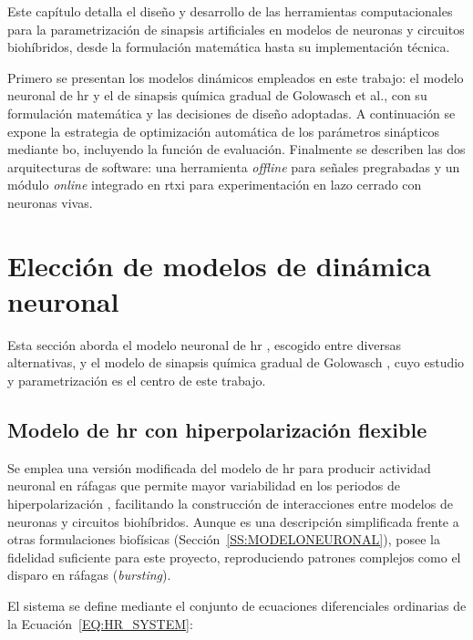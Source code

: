 
Este capítulo detalla el diseño y desarrollo de las herramientas computacionales para la parametrización de sinapsis artificiales en modelos de neuronas y circuitos biohíbridos, desde la formulación matemática hasta su implementación técnica.

Primero se presentan los modelos dinámicos empleados en este trabajo: el modelo neuronal de \ac{hr} y el de sinapsis química gradual de Golowasch et al., con su formulación matemática y las decisiones de diseño adoptadas. A continuación se expone la estrategia de optimización automática de los parámetros sinápticos mediante \ac{bo}, incluyendo la función de evaluación. Finalmente se describen las dos arquitecturas de software: una herramienta \textit{offline} para señales pregrabadas y un módulo \textit{online} integrado en \ac{rtxi} para experimentación en lazo cerrado con neuronas vivas.

\section{Elección de modelos de dinámica neuronal\label{SEC:MODELOS_DINAMICA_NEURONAL}}

Esta sección aborda el modelo neuronal de \ac{hr} \cite{Hindmarsh1984}, escogido entre diversas alternativas, y el modelo de sinapsis química gradual de Golowasch \cite{Golowasch1999}, cuyo estudio y parametrización es el centro de este trabajo.

\subsection{Modelo de \acl{hr} con hiperpolarización flexible\label{SUBSEC:HINDMARSH_ROSE}}

Se emplea una versión modificada del modelo de \ac{hr} para producir actividad neuronal en ráfagas que permite mayor variabilidad en los periodos de hiperpolarización \cite{Varona2024}, facilitando la construcción de interacciones entre modelos de neuronas y circuitos biohíbridos. Aunque es una descripción simplificada frente a otras formulaciones biofísicas (Sección~\ref{SS:MODELONEURONAL}), posee la fidelidad suficiente para este proyecto, reproduciendo patrones complejos como el disparo en ráfagas (\textit{bursting}).

El sistema se define mediante el conjunto de ecuaciones diferenciales ordinarias de la Ecuación~\ref{EQ:HR_SYSTEM}:


